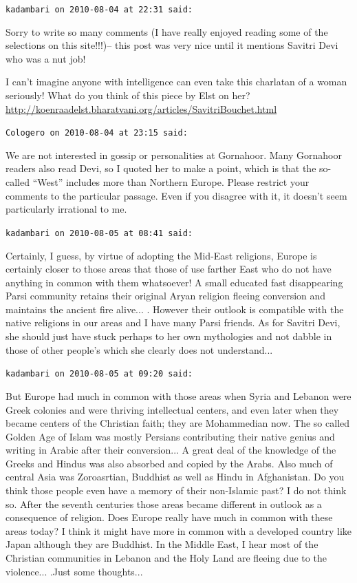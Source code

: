 \begin{footnotesize}
\begin{sffamily}
\texttt{kadambari on 2010-08-04 at 22:31 said:}

Sorry to write so many comments (I have really enjoyed reading some of the selections on this site!!!)-- this post was very nice until it mentions Savitri Devi who was a nut job!

I can't imagine anyone with intelligence can even take this charlatan of a woman seriously! What do you think of this piece by Elst on her?\\
\url{http://koenraadelst.bharatvani.org/articles/SavitriBouchet.html}


\hfill

\texttt{Cologero on 2010-08-04 at 23:15 said:}

We are not interested in gossip or personalities at Gornahoor. Many Gornahoor readers also read Devi, so I quoted her to make a point, which is that the so-called ``West'' includes more than Northern Europe. Please restrict your comments to the particular passage. Even if you disagree with it, it doesn't seem particularly irrational to me.

\hfill

\texttt{kadambari on 2010-08-05 at 08:41 said:}

Certainly, I guess, by virtue of adopting the Mid-East religions, Europe is certainly closer to those areas that those of use farther East who do not have anything in common with them whatsoever! A small educated fast disappearing Parsi community retains their original Aryan religion fleeing conversion and maintains the ancient fire alive... . However their outlook is compatible with the native religions in our areas and I have many Parsi friends. As for Savitri Devi, she should just have stuck perhaps to her own mythologies and not dabble in those of other people's which she clearly does not understand... \hfill

\texttt{kadambari on 2010-08-05 at 09:20 said:}

But Europe had much in common with those areas when Syria and Lebanon were Greek colonies and were thriving intellectual centers, and even later when they became centers of the Christian faith; they are Mohammedian now. The so called Golden Age of Islam was mostly Persians contributing their native genius and writing in Arabic after their conversion... A great deal of the knowledge of the Greeks and Hindus was also absorbed and copied by the Arabs. Also much of central Asia was Zoroasrtian, Buddhist as well as Hindu in Afghanistan. Do you think those people even have a memory of their non-Islamic past? I do not think so. After the seventh centuries those areas became different in outlook as a consequence of religion. Does Europe really have much in common with these areas today? I think it might have more in common with a developed country like Japan although they are Buddhist. In the Middle East, I hear most of the Christian communities in Lebanon and the Holy Land are fleeing due to the violence... .Just some thoughts... \hfill

\end{sffamily}
\end{footnotesize}


